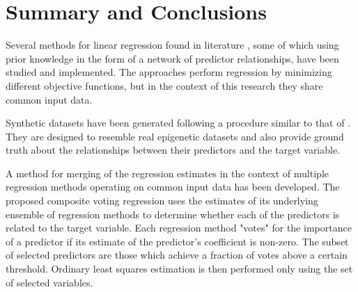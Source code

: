 \chapter{Summary and Conclusions}
Several methods for linear regression found in literature \cite{tibshirani1996regression,zou2005regularization,li2008network,li2010variable,pan2010incorporating,luo2012two,kim2013network}, some of which using prior knowledge in the form of a network of predictor relationships, have been studied and implemented. The approaches perform regression by minimizing different objective functions, but in the context of this research they share common input data.

Synthetic datasets have been generated following a procedure similar to that of \cite{li2008network}. They are designed to resemble real epigenetic datasets and also provide ground truth about the relationships between their predictors and the target variable.

A method for merging of the regression estimates in the context of multiple regression methods operating on common input data has been developed. The proposed composite voting regression uses the estimates of its underlying ensemble of regression methods to determine whether each of the predictors is related to the target variable. Each regression method "votes" for the importance of a predictor if its estimate of the predictor's coefficient is non-zero. The subset of selected predictors are those which achieve a fraction of votes above a certain threshold. Ordinary least squares estimation is then performed only using the set of selected variables.



